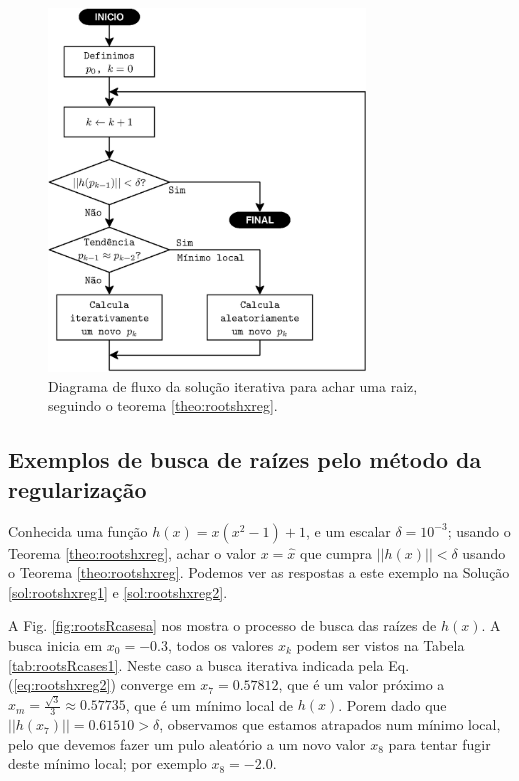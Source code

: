 \begin{figure}[!h]
     \centering
         \includegraphics[width=0.75\textwidth]{chapters/roots/fluxo3.eps}
        \caption{Diagrama de fluxo da solução iterativa para achar uma raiz, seguindo o teorema \ref{theo:rootshxreg}.}
        \label{fig:fluxorhxreg3}
\end{figure}

\subsection{Exemplos de busca de raízes pelo método da regularização}


\begin{example}\label{ex:rootshxreg1}
Conhecida uma função $h(x)=x(x^2-1)+1$, e um escalar $\delta=10^{-3}$; usando o Teorema \ref{theo:rootshxreg},
achar o valor $x=\hat{x}$ que cumpra $||h(x)||<\delta$ usando o Teorema \ref{theo:rootshxreg}.
Podemos ver as respostas a este exemplo na Solução \ref{sol:rootshxreg1} e \ref{sol:rootshxreg2}.
\end{example}
\begin{SolutionT}\label{sol:rootshxreg1}
 A Fig. \ref{fig:rootsRcasesa} nos mostra o processo de busca das raízes de $h(x)$. 
A busca inicia em $x_0=-0.3$, 
todos os valores $x_{k}$ podem ser vistos na
Tabela \ref{tab:rootsRcases1}. 
Neste caso a busca iterativa indicada pela Eq. (\ref{eq:rootshxreg2}) 
converge em $x_7=0.57812$, que é um valor próximo a $x_m=\frac{\sqrt{3}}{3}\approx 0.57735$,
que é um mínimo local de $h(x)$.
Porem dado que $||h(x_7)||=0.61510 >\delta$, observamos que estamos atrapados num mínimo local,
pelo que devemos fazer um pulo aleatório a um novo valor $x_8$
para tentar fugir deste mínimo local; por exemplo $x_8=-2.0$.
\end{SolutionT}

